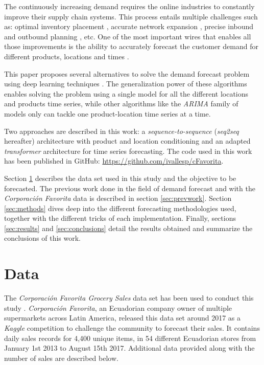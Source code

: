 \documentclass{elsarticle}
\begin{document}
	The continuously increasing demand requires the online industries to constantly improve their supply chain systems. This process entails multiple challenges such as: optimal inventory placement \cite{graves2008}, accurate network expansion \cite{hossein2017}, precise inbound and outbound planning \cite{kaipia2009}, etc. One of the most important wires that enables all those improvements is the ability to accurately forecast the customer demand for different products, locations and times \cite{forslund2007}.  
	
	This paper proposes several alternatives to solve the demand forecast problem using deep learning techniques \cite{Goodfellow2016}. The generalization power of these algorithms enables solving the problem using a single model for all the different locations and products time series, while other algorithms like the \textit{ARIMA} family of models \cite{Hyndman2018} only can tackle one product-location time series at a time. 
	
	Two approaches are described in this work: a \textit{sequence-to-sequence} (\textit{seq2seq} hereafter) architecture with product and location conditioning and an adapted \textit{transformer} architecture for time series forecasting. The code used in this work has been published in GitHub: \url{https://github.com/ivallesp/cFavorita}.
	
	 Section \ref{sec:data} describes the data set used in this study and the objective to be forecasted. The previous work done in the field of demand forecast and with the \textit{Corporación Favorita} data is described in section \ref{sec:prevwork}. Section \ref{sec:methods} dives deep into the different forecasting methodologies used, together with the different tricks of each implementation. 
	Finally, sections \ref{sec:results} and \ref{sec:conclusions} detail the results obtained and summarize the conclusions of this work.
	
	
	\section{Data} \label{sec:data}
	The \textit{Corporación Favorita Grocery Sales} data set  has been used to conduct this study \cite{corporacionfavoritadataset2018}. \textit{Corporación Favorita}, an Ecuadorian company owner of multiple supermarkets across Latin America, released this data set around 2017 as a \textit{Kaggle} competition to challenge the community to forecast their sales. It contains daily sales records for 4,400 unique items, in 54 different Ecuadorian stores from January 1st 2013 to August 15th 2017. Additional data provided along with the number of sales are described below.
	
\end{document}
